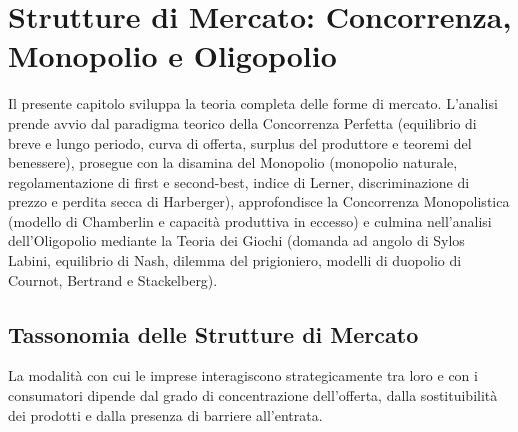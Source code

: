 \chapter{Strutture di Mercato: Concorrenza, Monopolio e Oligopolio}
\label{chap:strutture_mercato}

\begin{tcolorbox}[colback=navyblue!5!white, colframe=navyblue, title=\textbf{Quadro Concettuale del Capitolo}]
Il presente capitolo sviluppa la teoria completa delle forme di mercato. L'analisi prende avvio dal paradigma teorico della Concorrenza Perfetta (equilibrio di breve e lungo periodo, curva di offerta, surplus del produttore e teoremi del benessere), prosegue con la disamina del Monopolio (monopolio naturale, regolamentazione di first e second-best, indice di Lerner, discriminazione di prezzo e perdita secca di Harberger), approfondisce la Concorrenza Monopolistica (modello di Chamberlin e capacità produttiva in eccesso) e culmina nell'analisi dell'Oligopolio mediante la Teoria dei Giochi (domanda ad angolo di Sylos Labini, equilibrio di Nash, dilemma del prigioniero, modelli di duopolio di Cournot, Bertrand e Stackelberg).
\end{tcolorbox}

\section{Tassonomia delle Strutture di Mercato}

La modalità con cui le imprese interagiscono strategicamente tra loro e con i consumatori dipende dal grado di concentrazione dell'offerta, dalla sostituibilità dei prodotti e dalla presenza di barriere all'entrata.

